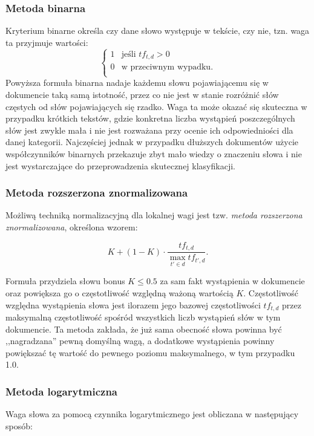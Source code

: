 \documentclass{pracamgr}
\begin{document}
\subsubsection*{Metoda binarna}

Kryterium binarne określa czy dane słowo występuje w tekście, czy nie, tzn. waga ta przyjmuje wartości:
\[ 
\begin{cases} 
    1 & \text{jeśli } tf_{t,d} > 0 \\ 
    0 & \text{w przeciwnym wypadku.} \\ 
\end{cases} 
\] 
Powyższa formuła binarna nadaje każdemu słowu pojawiającemu się w dokumencie taką samą istotność, przez co nie jest w stanie rozróżnić słów częstych od słów pojawiających się rzadko. Waga ta może okazać się skuteczna w przypadku krótkich tekstów, gdzie konkretna liczba wystąpień poszczególnych słów jest zwykle mała i nie jest rozważana przy ocenie ich odpowiedniości dla danej kategorii. Najczęściej jednak w przypadku dłuższych dokumentów użycie współczynników binarnych przekazuje zbyt mało wiedzy o znaczeniu słowa i nie jest wystarczające do przeprowadzenia skutecznej klasyfikacji.

\subsubsection*{Metoda rozszerzona znormalizowana}

Możliwą techniką normalizacyjną dla lokalnej wagi jest tzw. \textit{metoda rozszerzona znormalizowana}, określona wzorem:

\[
K + (1 - K) \cdot \frac{tf_{t,d}}{\max_{t' \in d} tf_{t',d}}.
\]

Formuła przydziela słowu bonus $K \leq 0.5$ za sam fakt wystąpienia w dokumencie oraz powiększa go o częstotliwość względną ważoną wartością $K$. Częstotliwość względna wystąpienia słowa jest ilorazem jego bazowej częstotliwości $tf_{t,d}$ przez maksymalną częstotliwość spośród wszystkich liczb wystąpień słów w tym dokumencie. Ta metoda zakłada, że już sama obecność słowa powinna być ,,nagradzana'' pewną domyślną wagą, a dodatkowe wystąpienia powinny powiększać tę wartość do pewnego poziomu maksymalnego, w tym przypadku 1.0.

\subsubsection*{Metoda logarytmiczna}
Waga słowa za pomocą czynnika logarytmicznego jest obliczana w następujący sposób:
\end{document}
